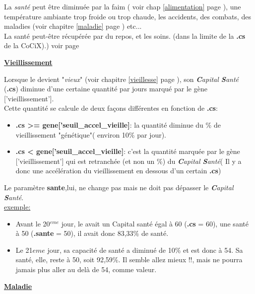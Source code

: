 \documentclass[french]{report}
\newlength{\du}\fi
\begin{document}

La \textit{santé} peut être diminuée par la faim ( voir chap \ref{alimentation} page \pageref{alimentation}), une température ambiante trop froide ou trop chaude, les accidents, des combats, des maladies (voir chapitre \ref{maladie} page \pageref{maladie}) etc...\\

La santé peut-être récupérée par du repos, et les soins. (dans la limite de la \textbf{.cs} de la CoCiX).) voir page \pageref{repos}\\

\begin{center}
\underline{\textbf{Vieillissement}}\label{vieillissement}
\end{center}
Lorsque le \CoCiX devient "\textit{vieux}" (voir chapitre \ref{vieillesse} page \pageref{vieillesse}), son \textit{\textbf{C}apital \textbf{S}anté} (\textbf{.cs}) diminue d'une certaine quantité par jours marqué par le gène ['vieillissement'].\\
Cette quantité se calcule de deux façons différentes en fonction de \textbf{.cs}:
\begin{itemize}
	\item \textbf{.cs >= gene['seuil\_accel\_vieille]}: la quantité diminue du \% de vieillissement "génétique"( environ 10\% par jour).
	\item \textbf{.cs <  gene['seuil\_accel\_vieille]}: c'est la quantité marquée par le gène ['vieillissement'] qui est retranchée (et non un \%) du \textit{\textbf{C}apital \textbf{S}anté}( Il y a donc une accélération du vieillissement en dessous d'un certain \textbf{.cs})\\
\end{itemize}

Le paramètre \textbf{sante},lui, ne change pas mais ne doit pas dépasser le \textit{\textbf{C}apital \textbf{S}anté}.\\

\underline{exemple:}\\
\begin{itemize}
\item Avant le 20$^{eme}$ jour, le \CoCiX avait un Capital santé égal à  60 (\textbf{.cs} = 60), une santé à 50 (\textbf{.sante} = 50), il avait donc 83,33\% de santé.\\

\item Le 21${eme}$ jour, sa capacité de santé a diminué de 10\% et est donc à 54. Sa santé, elle, reste à 50, soit 92,59\%. Il semble allez mieux !!, mais ne pourra jamais plus aller au delà de 54, comme valeur.\\
\end{itemize}
\begin{center}
\underline{\textbf{Maladie}}\label{maladie}
\end{center}
\end{document}
